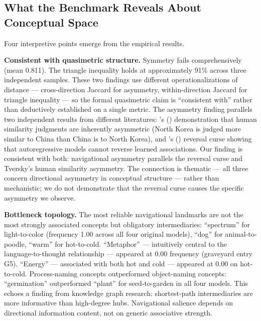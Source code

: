\subsection{What the Benchmark Reveals About Conceptual Space}\label{what-the-benchmark-reveals-about-conceptual-space}

Four interpretive points emerge from the empirical results.

\textbf{Consistent with quasimetric structure.} Symmetry fails comprehensively (mean 0.811). The triangle inequality holds at approximately 91\% across three independent samples. These two findings use different operationalizations of distance --- cross-direction Jaccard for asymmetry, within-direction Jaccard for triangle inequality --- so the formal quasimetric claim is ``consistent with'' rather than deductively established on a single metric. The asymmetry finding parallels two independent results from different literatures: \citeauthor{tversky1977features}'s (\citeyear{tversky1977features}) demonstration that human similarity judgments are inherently asymmetric (North Korea is judged more similar to China than China is to North Korea), and \citeauthor{berglund2024reversal}'s (\citeyear{berglund2024reversal}) reversal curse showing that autoregressive models cannot reverse learned associations. Our finding is consistent with both: navigational asymmetry parallels the reversal curse and Tversky's human similarity asymmetry. The connection is thematic --- all three concern directional asymmetry in conceptual structure --- rather than mechanistic; we do not demonstrate that the reversal curse causes the specific asymmetry we observe.

\textbf{Bottleneck topology.} The most reliable navigational landmarks are not the most strongly associated concepts but obligatory intermediaries: ``spectrum'' for light-to-color (frequency 1.00 across all four original models), ``dog'' for animal-to-poodle, ``warm'' for hot-to-cold. ``Metaphor'' --- intuitively central to the language-to-thought relationship --- appeared at 0.00 frequency (graveyard entry G5). ``Energy'' --- associated with both hot and cold --- appeared at 0.00 on hot-to-cold. Process-naming concepts outperformed object-naming concepts: ``germination'' outperformed ``plant'' for seed-to-garden in all four models. This echoes a finding from knowledge graph research: shortest-path intermediaries are more informative than high-degree hubs. Navigational salience depends on directional information content, not on generic associative strength.

